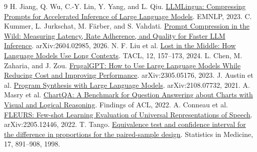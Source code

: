 \documentclass[10pt]{article}
\begin{document}
\begin{thebibliography}{9}
 H. Jiang, Q. Wu, C.-Y. Lin, Y. Yang, and L. Qiu.
\href{https://aclanthology.org/2023.emnlp-main.825/}{LLMLingua: Compressing Prompts for Accelerated Inference of Large Language Models}. EMNLP, 2023.
 C. Kummer, L. Jurkschat, M. F\"arber, and S. Vahdati.
\href{https://arxiv.org/abs/2604.02985}{Prompt Compression in the Wild: Measuring Latency, Rate Adherence, and Quality for Faster LLM Inference}. arXiv:2604.02985, 2026.
 N. F. Liu et al.
\href{https://aclanthology.org/2024.tacl-1.9/}{Lost in the Middle: How Language Models Use Long Contexts}. TACL, 12, 157--173, 2024.
 L. Chen, M. Zaharia, and J. Zou.
\href{https://arxiv.org/abs/2305.05176}{FrugalGPT: How to Use Large Language Models While Reducing Cost and Improving Performance}. arXiv:2305.05176, 2023.
 J. Austin et al.
\href{https://arxiv.org/abs/2108.07732}{Program Synthesis with Large Language Models}. arXiv:2108.07732, 2021.
 A. Masry et al.
\href{https://aclanthology.org/2022.findings-acl.177/}{ChartQA: A Benchmark for Question Answering about Charts with Visual and Logical Reasoning}. Findings of ACL, 2022.
 A. Conneau et al.
\href{https://arxiv.org/abs/2205.12446}{FLEURS: Few-shot Learning Evaluation of Universal Representations of Speech}. arXiv:2205.12446, 2022.
 T. Tango.
\href{https://pubmed.ncbi.nlm.nih.gov/9595618/}{Equivalence test and confidence interval for the difference in proportions for the paired-sample design}. Statistics in Medicine, 17, 891--908, 1998.
\end{thebibliography}
\end{document}
